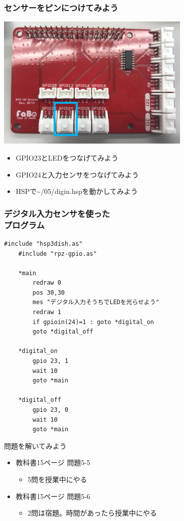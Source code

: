 \begin{frame}
    \frametitle{センサーをピンにつけてみよう}
    \begin{center}
        \includegraphics[width=0.7\textwidth]{images/chap05/text05-img029.png}
        \begin{itemize}
            \item GPIO23とLEDをつなげてみよう
            \item GPIO24と入力センサをつなげてみよう
            \item HSPで\textasciitilde/05/digin.hspを動かしてみよう
        \end{itemize}
    \end{center}
\end{frame}

\begin{frame}[fragile]
    \frametitle{デジタル入力センサを使った\\プログラム}
    \begin{lstlisting}[title=\textasciitilde/05/digin.hsp]
    #include "hsp3dish.as"
    #include "rpz-gpio.as"

    *main
	    redraw 0
	    pos 30,30
	    mes "デジタル入力そうちでLEDを光らせよう"
	    redraw 1
	    if gpioin(24)=1 : goto *digital_on
	    goto *digital_off
        
    *digital_on
	    gpio 23, 1
	    wait 10
	    goto *main

    *digital_off
	    gpio 23, 0
	    wait 10
	    goto *main 
    \end{lstlisting}
\end{frame}

\begin{frame}[fragile]
    \begin{exampleblock}{問題を解いてみよう}
    \begin{itemize}
        \item 教科書15ページ 問題5-5
        \begin{itemize}
            \item 5問を授業中にやる
        \end{itemize}
        \item 教科書15ページ 問題5-6
        \begin{itemize}
            \item 2問は宿題。時間があったら授業中にやる
        \end{itemize}
    \end{itemize}
    \end{exampleblock}
\end{frame}